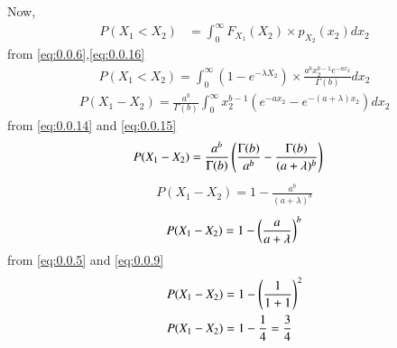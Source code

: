 \documentclass[journal,12pt,twocolumn]{IEEEtran}
\begin{document}
\begin{enumerate}
  Now,
\begin{align}
      P(X_1<X_2)&=\int_{0}^\infty F_{X_1}(X_2) \times p_{X_2}(x_2)dx_2
      \end{align}
      from \eqref{eq:0.0.6},\eqref{eq:0.0.16}
  \begin{align}
     P(X_1<X_2)=\int_{0}^\infty (1-e^{-\lambda X_2})\times \frac{a^b x_2^{b-1}e^{-ax_2}}{\Gamma(b)} dx_2
     \end{align}
     \begin{align}
     P(X_1-X_2)=\frac{a^b}{\Gamma(b)}\int_{0}^\infty x_2^{b-1}(e^{-ax_2}-e^{-(a+\lambda)x_2})dx_2
  \end{align}
      from \eqref{eq:0.0.14} and \eqref{eq:0.0.15}
      \begin{align}
     P(X_1-X_2)&=\frac{a^b}{\Gamma(b)}\left(\frac{\Gamma(b)}{a^b}-\frac{\Gamma(b)}{(a+\lambda)^b}\right)
     \end{align}
 \begin{align}
      P(X_1-X_2)=1-\frac{a^b}{(a+\lambda)^b}
 \end{align}
 \begin{align}
     P(X_1-X_2)=1-\left(\frac{a}{a+\lambda}\right)^b
 \end{align}
 from \eqref{eq:0.0.5} and \eqref{eq:0.0.9}
 \begin{align}
     P(X_1-X_2)&=1-\left(\frac{1}{1+1}\right)^2\\
     P(X_1-X_2)&=1-\frac{1}{4}=\frac{3}{4}
 \end{align}
\end{enumerate}
\end{document}
